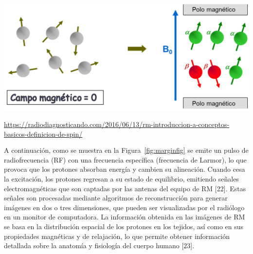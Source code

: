 \begin{marginfigure}
\includegraphics{Introduction/image.png}
\caption{\url{https://radiodiagnosticando.com/2016/06/13/rm-introduccion-a-conceptos-basicos-definicion-de-spin/}}
\label{fig:marginfig}
\end{marginfigure}

A continuación, como se muestra en la Figura~\ref{fig:marginfig} se emite un pulso de radiofrecuencia (RF) con una frecuencia específica (frecuencia de Larmor), lo que provoca que los protones absorban energía y cambien su alineación. Cuando cesa la excitación, los protones regresan a su estado de equilibrio, emitiendo señales electromagnéticas que son captadas por las antenas del equipo de RM [22]. Estas señales son procesadas mediante algoritmos de reconstrucción para generar imágenes en dos o tres dimensiones, que pueden ser visualizadas por el radiólogo en un monitor de computadora. La información obtenida en las imágenes de RM se basa en la distribución espacial de los protones en los tejidos, así como en sus propiedades magnéticas y de relajación, lo que permite obtener información detallada sobre la anatomía y fisiología del cuerpo humano [23].\cite{DBLP:conf/icann/2006-1}

